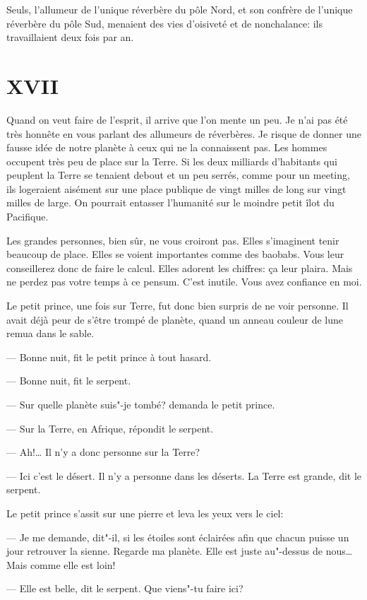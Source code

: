 \begin{Parallel}[p]{}{}
{Seuls, l'allumeur de l'unique réverbère du pôle
Nord, et son confrère de l'unique réverbère du pôle
Sud, menaient des vies d'oisiveté et de nonchalance: ils travaillaient deux fois par an.

\section{XVII}

Quand on veut faire de l'esprit, il arrive que l'on
mente un peu. Je n'ai pas été très honnête en vous
parlant des allumeurs de réverbères. Je risque de
donner une fausse idée de notre planète à ceux qui
ne la connaissent pas. Les hommes occupent très
peu de place sur la Terre. Si les deux milliards d'habitants qui peuplent la Terre se tenaient debout et
un peu serrés, comme pour un meeting, ils logeraient aisément sur une place publique de vingt
milles de long sur vingt milles de large. On pourrait
entasser l'humanité sur le moindre petit îlot du
Pacifique.

Les grandes personnes, bien sûr, ne vous croiront
pas. Elles s'imaginent tenir beaucoup de place. Elles
se voient importantes comme des baobabs. Vous
leur conseillerez donc de faire le calcul. Elles adorent les chiffres: ça leur plaira. Mais ne perdez pas
votre temps à ce pensum. C'est inutile. Vous avez
confiance en moi.

Le petit prince, une fois sur Terre, fut donc bien
surpris de ne voir personne. Il avait déjà peur de
s'être trompé de planète, quand un anneau couleur
de lune remua dans le sable.

--- Bonne nuit, fit le petit prince à tout hasard.

--- Bonne nuit, fit le serpent.

--- Sur quelle planète suis"-je tombé? demanda le petit prince.

--- Sur la Terre, en Afrique, répondit le serpent.

--- Ah!\ldots{} Il n'y a donc personne sur la Terre?

--- Ici c'est le désert. Il n'y a personne dans les
déserts. La Terre est grande, dit le serpent.

Le petit prince s'assit sur une pierre et leva les yeux vers le ciel:

--- Je me demande, dit"-il, si les étoiles sont éclairées
afin que chacun puisse un jour retrouver la sienne. Regarde ma planète. Elle est juste au"-dessus de
nous\ldots{} Mais comme elle est loin!

--- Elle est belle, dit le serpent. Que viens"-tu faire ici?

}
\end{Parallel}
